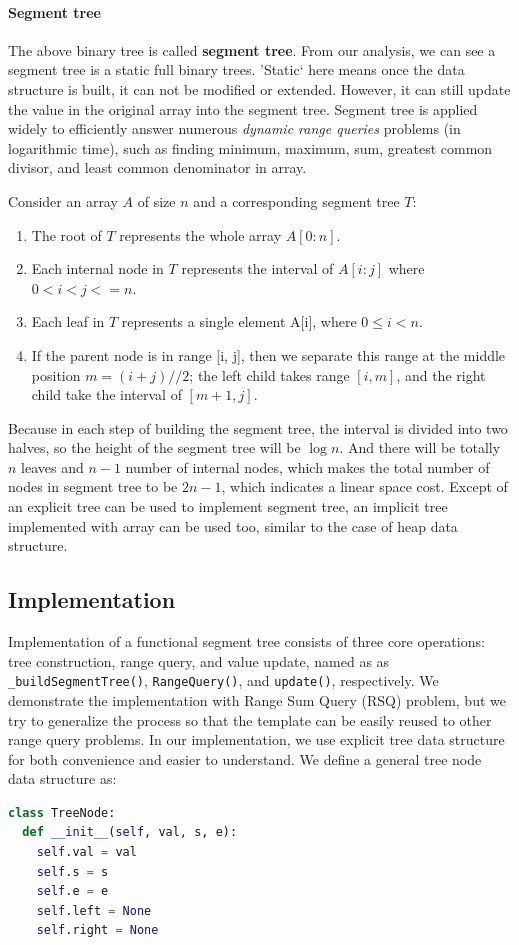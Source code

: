 \documentclass[main.tex]{subfiles}
\begin{document}
\paragraph{Segment tree} The above binary tree is called \textbf{segment tree}. From our analysis, we can see a segment tree is a static full binary trees. 'Static` here means once the data structure is built, it can not be modified or extended.  However, it can still update the value in the original array into the segment tree. Segment tree is applied widely to efficiently answer numerous \textit{dynamic range queries} problems 
(in logarithmic time), such as finding minimum, maximum, sum, greatest common divisor, and least common denominator in array.


Consider an array $A$ of size $n$ and a corresponding segment tree $T$:
\begin{enumerate}
    \item The root of $T$ represents the whole array $A[0:n]$. 
    \item Each internal node in $T$ represents the interval of $A[i:j]$ where $0 < i < j <= n$. 
    \item Each leaf in $T$ represents a single element A[i], where $0 \leq i<n$. 
    \item If the parent node is in range [i, j], then we separate this range at the middle position $m = (i+j)//2$; the left child takes range $[i, m]$, and the right child take the interval of $[m+1, j]$.
\end{enumerate}

Because in each step of building the segment tree, the interval is divided into two halves, so the height of the segment tree will be $\log n$. And there will be totally $n$ leaves and $n-1$ number of internal nodes, which makes the total number of nodes in segment tree to be $2n-1$, which indicates a linear space cost. Except of an explicit tree can be used to implement segment tree, an implicit tree implemented with  array can be used too, similar to the case of heap data structure. 

\subsection{Implementation}
Implementation of a functional segment tree consists of three core operations: tree construction, range query, and value update, named as as \texttt{\_buildSegmentTree()}, \texttt{RangeQuery()}, and \texttt{update()}, respectively. We demonstrate the implementation with Range Sum Query (RSQ) problem, but we try to generalize the process so that the template can be easily reused to other range query problems. In our implementation, we use explicit tree data structure for both convenience and easier to understand. We define a general tree node data structure as:
\begin{lstlisting}[language=Python]
class TreeNode:
  def __init__(self, val, s, e):
    self.val = val
    self.s = s
    self.e = e
    self.left = None
    self.right = None
\end{lstlisting}
\end{document}
